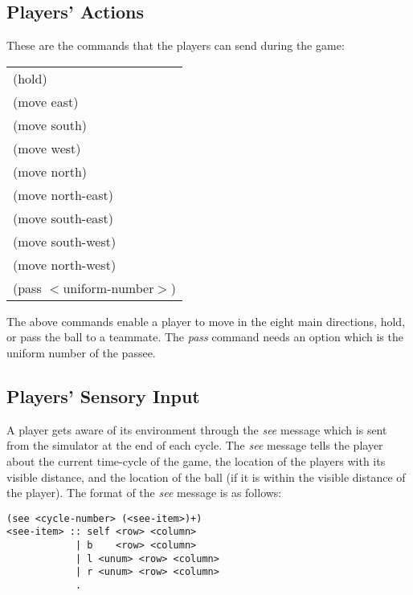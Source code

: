 \documentclass[12pt,titlepage,a4paper]{article}
\begin{document}
\subsection{Players' Actions}

These are the commands that the players can send during the game:
\vspace{1cm}

\begin{tabular}{|l|} \hline
\textrm{(hold)} \\ %
\textrm{(move east)} \\ %
\textrm{(move south)} \\ %
\textrm{(move west)} \\ %
\textrm{(move north)} \\ %
\textrm{(move north-east)} \\ %
\textrm{(move south-east)} \\ %
\textrm{(move south-west)} \\ %
\textrm{(move north-west)} \\ %
\textrm{(pass $<$uniform-number$>$)} \\ \hline
\end{tabular}
\vspace{1cm}

The above commands enable a player to move in the eight main directions, hold, or pass the ball to a teammate. The \emph{pass} command needs an option which is the uniform number of the passee.

\subsection{Players' Sensory Input}

A player gets aware of its environment through the \emph{see} message which is sent from the simulator at the end of each cycle. The \emph{see} message tells the player about the current time-cycle of the game, the location of the players with its visible distance, and the location of the ball (if it is within the visible distance of the player). The format of the \emph{see} message is as follows:

\begin{verbatim}
(see <cycle-number> (<see-item>)+)
<see-item> :: self <row> <column>
            | b    <row> <column>
            | l <unum> <row> <column>
            | r <unum> <row> <column>
            .
\end{verbatim}
\end{document}
